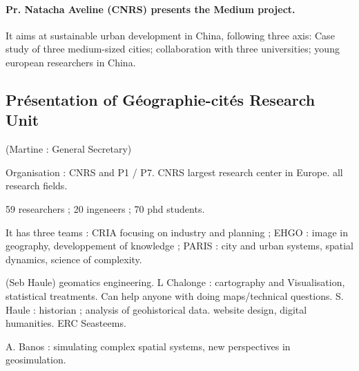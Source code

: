\paragraph{Pr. Natacha Aveline (CNRS) presents the Medium project.}


It aims at sustainable urban development in China, following three axis: Case study of three medium-sized cities; collaboration with three universities; young european researchers in China.









\subsection*{Pr{\'e}sentation of G{\'e}ographie-cit{\'e}s Research Unit}


(Martine : General Secretary)


Organisation : CNRS and P1 / P7. CNRS largest research center in Europe. all research fields.

59 researchers ; 20 ingeneers ; 70 phd students.

It has three teams : CRIA focusing on industry and planning ; EHGO : image in geography, developpement of knowledge ; PARIS : city and urban systems, spatial dynamics, science of complexity.

(Seb Haule) geomatics engineering. L Chalonge : cartography and Visualisation, statistical treatments. Can help anyone with doing maps/technical questions.
S. Haule : historian ; analysis of geohistorical data. website design, digital humanities. ERC Seasteems.

A. Banos : simulating complex spatial systems, new perspectives in geosimulation.


